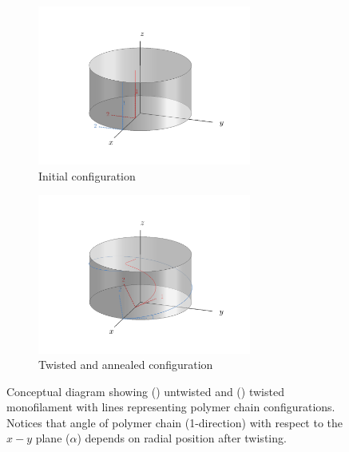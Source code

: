 \documentclass[twocolumn,10pt]{asme2e}
\begin{document}
\begin{figure}
    \centering
     \begin{subfigure}[b]{0.5\textwidth}
        \includegraphics[width=7cm, clip = true, trim = {0.8in 0.5in  0.8in 0.8in}]{../Images/helix_2_initial.pdf}
        \caption{Initial configuration }
        \label{fig:helix_init}
        \end{subfigure}
     \begin{subfigure}[b]{0.5\textwidth}
        \includegraphics[width=7cm, clip = true, trim = {0.8in 0.5in  0.8in 0.8in}]{../Images/helix_2.pdf}
        \caption{Twisted and annealed configuration}
        \label{fig:helix_final}
        \end{subfigure}
        \caption{Conceptual diagram showing () untwisted and () twisted monofilament with lines representing polymer chain configurations. Notices that angle of polymer chain (1-direction) with respect to the $x-y$ plane ($\alpha$) depends on radial position after twisting.}
        \label{fig:helix}
\end{figure}
\end{document}
